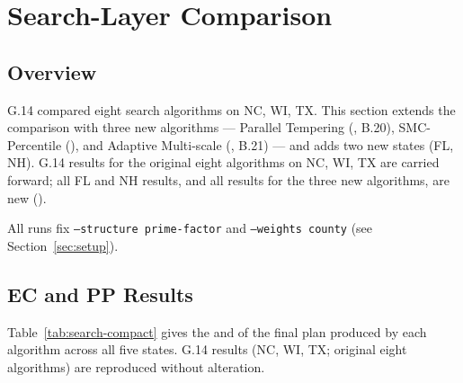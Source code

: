 \section{Search-Layer Comparison}
\label{sec:search}

\subsection{Overview}

G.14 compared eight search algorithms on NC, WI, TX.
This section extends the comparison with three new algorithms --- Parallel
Tempering (\pt{}, B.20), SMC-Percentile (\smcp{}), and Adaptive Multi-scale
(\ams{}, B.21) --- and adds two new states (FL, NH).
G.14 results for the original eight algorithms on NC, WI, TX are carried
forward; all FL and NH results, and all results for the three new algorithms,
are new (\dag{}).

All runs fix \texttt{--structure prime-factor} and \texttt{--weights county}
(see Section~\ref{sec:setup}).

\subsection{EC and PP Results}

Table~\ref{tab:search-compact} gives the \ec{} and \pp{} of the final plan
produced by each algorithm across all five states.
G.14 results (NC, WI, TX; original eight algorithms) are reproduced without
alteration.

